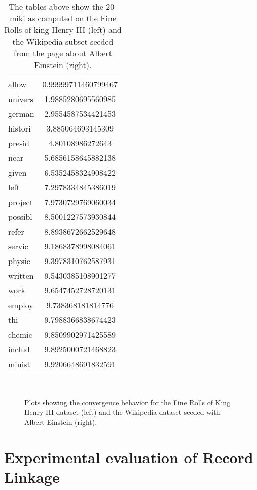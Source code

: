 \begin{table}
\begin{minipage}{.5\textwidth}
\begin{tabular}{l S[round-precision=4]}
    		\midrule
    		allow & 0.99999711460799467\\
    		univers & 1.9885280695560985\\
    		german & 2.9554587534421453\\
    		histori & 3.885064693145309\\
    		presid & 4.80108986272643\\
    		near & 5.6856158645882138\\
    		given & 6.5352458324908422\\
    		left & 7.2978334845386019\\
    		project & 7.9730729769060034\\
    		possibl & 8.5001227573930844\\
    		refer & 8.8938672662529648\\
    		servic & 9.1868378998084061\\
    		physic & 9.3978310762587931\\
    		written & 9.5430385108901277\\
    		work & 9.6547452728720131\\
    		employ & 9.738368181814776\\
    		thi & 9.7988366838674423\\
    		chemic & 9.8509902971425589\\
    		includ & 9.8925000721468823\\
    		minist & 9.9206648691832591\\
    		\bottomrule
    	\end{tabular}
    	\label{t:miki_wikipedia}
    \end{minipage}
    \caption{The tables above show the 20-miki as computed on the Fine Rolls of king Henry III (left) and the Wikipedia subset seeded from the page about Albert Einstein (right).}
\end{table}

\begin{figure}
    ~
    
    \caption{Plots showing the convergence behavior for the Fine Rolls of King Henry III dataset (left) and the Wikipedia dataset seeded with Albert Einstein (right).}\label{fig:1}
\end{figure}




\section{Experimental evaluation of Record Linkage}
\label{sec:record_linkage_evaluation}
